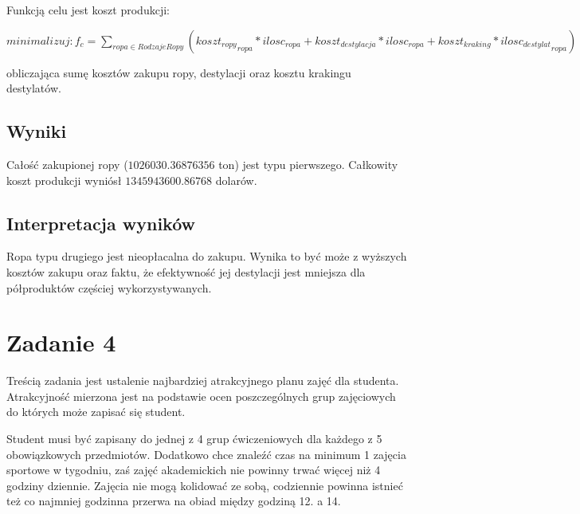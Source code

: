 \documentclass[polish,12pt,titlepage]{article}
\begin{document}
Funkcją celu jest koszt produkcji:
\begin{center}
$minimalizuj: f_{c} = \sum_{ropa \in RodzajeRopy}({koszt_{ropy}}_{ropa} * ilosc_{ropa} +  koszt_{destylacja} * ilosc_{ropa} + koszt_{kraking} * {ilosc_{destylat}}_{ropa})$
\end{center}
obliczająca sumę kosztów zakupu ropy, destylacji oraz kosztu krakingu destylatów.

\subsection{Wyniki}

Całość zakupionej ropy ($1026030.36876356$ ton) jest typu pierwszego. Całkowity koszt produkcji wyniósł $1345943600.86768$ dolarów.

\subsection{Interpretacja wyników}

Ropa typu drugiego jest nieopłacalna do zakupu. Wynika to być może z wyższych kosztów zakupu oraz faktu, że efektywność jej destylacji jest mniejsza dla półproduktów częściej wykorzystywanych.

\section{Zadanie 4}

Treścią zadania jest ustalenie najbardziej atrakcyjnego planu zajęć dla studenta. Atrakcyjność mierzona jest na podstawie ocen poszczególnych grup zajęciowych do których może zapisać się student.

Student musi być zapisany do jednej z 4 grup ćwiczeniowych dla każdego z 5 obowiązkowych przedmiotów. Dodatkowo chce znaleźć czas na minimum 1 zajęcia sportowe w tygodniu, zaś zajęć akademickich nie powinny trwać więcej niż 4 godziny dziennie. Zajęcia nie mogą kolidować ze sobą, codziennie powinna istnieć też co najmniej godzinna przerwa na obiad między godziną 12. a 14.
\end{document}
